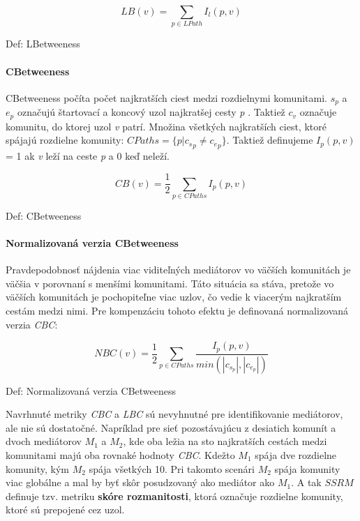 \documentclass[slovak,master,public,dept460,male,cpdeclaration,oneside]{diploma}
\begin{document}
\begin{mycapequ}[!ht]
   \begin{equation*}
     LB(v) = \sum_{p \in LPath} I_{l}(p, v)
   \end{equation*}
   \caption{Def: LBetweeness}
\end{mycapequ}


\paragraph{CBetweeness}
\hfill \break
CBetweeness počíta počet najkratších ciest medzi rozdielnymi komunitami. \textit{${s_p}$} a \textit{${e_p}$} označujú štartovací a koncový uzol najkratšej cesty \textit{p} . Taktiež \textit{${c_v}$} označuje komunitu, do ktorej uzol \textit{v} patrí. Množina všetkých najkratších ciest, ktoré spájajú rozdielne komunity:  
\textit{${CPaths = \{ p | {c_s}_p \neq {c_e}_p} \}$}. Taktiež definujeme ${I_p(p, v)}$ = 1 ak \textit{v} leží na ceste \textit{p} a 0 keď neleží.


\begin{mycapequ}[!ht]
   \begin{equation*}
    CB(v) = \frac{1}{2} \sum_{p \in CPaths} I_{p}(p, v)
   \end{equation*}
   \caption{Def: CBetweeness}
\end{mycapequ}


\paragraph{Normalizovaná verzia CBetweeness}
\hfill \break
Pravdepodobnosť nájdenia viac viditeľných mediátorov vo väčších komunitách je väčšia v porovnaní s menšími komunitami. Táto situácia sa stáva, pretože vo väčších komunitách je pochopiteľne viac uzlov, čo vedie k viacerým najkratším cestám medzi nimi. Pre kompenzáciu tohoto efektu je definovaná normalizovaná verzia \textit{CBC}: 


\begin{mycapequ}[!ht]
   \begin{equation*}
    NBC(v) = \frac{1}{2} \sum_{p \in CPaths} \frac{I_{p}(p, v)}{min(|c_{s_{p}}|,|c_{e_{p}}|)}
   \end{equation*}
   \caption{Def: Normalizovaná verzia CBetweeness}
\end{mycapequ}




\begin{sloppypar}
Navrhnuté metriky \textit{CBC} a \textit{LBC} sú nevyhnutné pre identifikovanie mediátorov, ale nie sú dostatočné. Napríklad pre sieť pozostávajúcu z desiatich komunít a dvoch mediátorov \textit{${M_1}$}
a \textit{${M_2}$}, kde oba ležia na sto najkratších cestách medzi komunitami majú oba rovnaké hodnoty \textit{CBC}. Kdežto \textit{${M_1}$} spája dve rozdielne komunity, kým \textit{${M_2}$} spája všetkých 10. Pri takomto scenári \textit{${M_2}$} spája komunity viac globálne a mal by byť skôr posudzovaný ako mediátor ako \textit{${M_1}$}. A tak \textit{${SSRM}$} definuje tzv. metriku \textbf{skóre rozmanitosti}, ktorá označuje rozdielne komunity, ktoré sú prepojené cez uzol.
\end{sloppypar}
\end{document}
